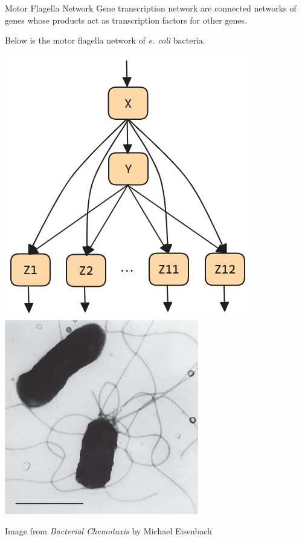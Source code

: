 \documentclass{beamer}
\begin{document}
\begin{frame}{Motor Flagella Network}
    Gene transcription network are connected networks of genes whose products act as transcription factors for other genes.

    \vspace*{0.125in}
    Below is the motor flagella network of \textit{e. coli} bacteria.

    \begin{center}
        \includegraphics[scale=0.25]{multioutput_FFL_color.png}
        \hspace*{0.25in}
        \includegraphics[scale=0.35]{Flagella-of-E-coli-observed-in-transmission-electron-microscope-Bar-1mm_Q320-2724765803.jpg}
    \end{center}

    \begin{footnotesize}
        \hspace*{\fill}Image from \textit{Bacterial Chemotaxis} by Michael Eisenbach
    \end{footnotesize}
\end{frame}
\end{document}
